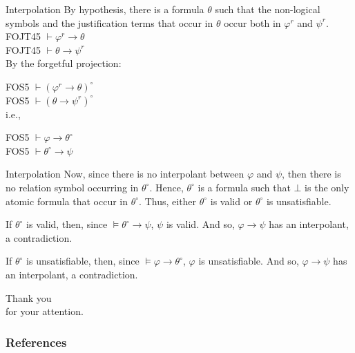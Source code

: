 \documentclass{beamer}
\theoremstyle{definition}
\newcommand{\impli}{\rightarrow}
\newcommand{\teo}{\vdash}
\begin{document}
\begin{frame}{Interpolation}
\qquad By hypothesis, there is a formula $\theta$ such that the non-logical symbols and the justification terms that occur in $\theta$ occur both in $\varphi^{r}$ and $\psi^{r}$. \\
\vspace{5mm}
FOJT45 $\teo \varphi^{r} \impli \theta$\\
FOJT45 $\teo \theta \impli \psi^{r}$\\	
\vspace{5mm}
\qquad By the forgetful projection: 



\vspace{5mm}
FOS5 $\teo (\varphi^{r} \impli \theta)^{\circ}$\\
FOS5 $\teo (\theta \impli \psi^{r})^{\circ}$\\	
\vspace{5mm}
i.e.,

\vspace{5mm}
FOS5 $\teo \varphi \impli \theta^{\circ}$\\
FOS5 $\teo \theta^{\circ} \impli \psi$\\	

\end{frame}


\begin{frame}{Interpolation}
\qquad Now, since there is no interpolant between $\varphi$ and $\psi$, then there is no relation symbol occurring in $\theta^{\circ}$. Hence, $\theta^{\circ}$ is a formula such that $\bot$ is the only atomic formula that occur in $\theta^{\circ}$. Thus, either $\theta^{\circ}$ is valid or $\theta^{\circ}$ is unsatisfiable.
\vspace{5mm}

\qquad If $\theta^{\circ}$ is valid, then, since $\models \theta^{\circ}\impli \psi$, $\psi$ is valid. And so, $\varphi \impli \psi$ has an interpolant, a contradiction.

\vspace{5mm}

\qquad If $\theta^{\circ}$ is unsatisfiable, then, since $\models \varphi \impli \theta^{\circ}$, $\varphi$ is unsatisfiable. And so, $\varphi \impli \psi$ has an interpolant, a contradiction.


\end{frame}





\begin{frame}

\begin{center}
{\color{blue} Thank you\\ for your attention.}
\end{center} 
	
	
\end{frame}












\begin{frame}[allowframebreaks]
\frametitle{References}


\end{frame}
\end{document}
